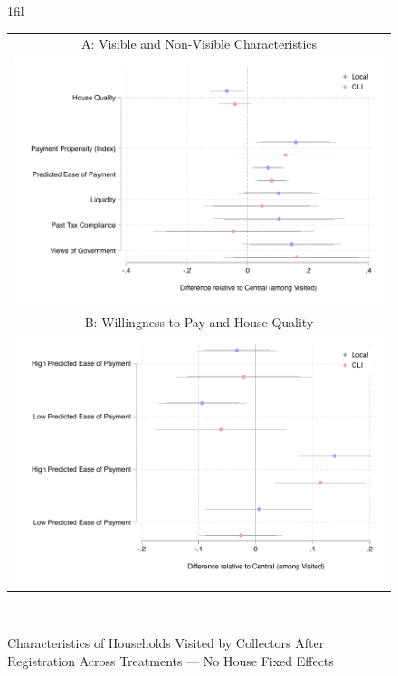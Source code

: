 \documentclass[12pt,english]{article}
\makeatletter
\newcommand*{\centerfloat}{%
  \parindent \z@
  \leftskip \z@ \@plus 1fil \@minus \textwidth
  \rightskip\leftskip
  \parfillskip \z@skip}
\makeatother
\begin{document}
\begin{figure}[H]
\centering{}\caption{Characteristics of Households Visited by Collectors After Registration Across Treatments --- No House Fixed Effects
\label{fig:main_targeting1_NoHouseFE}}
\centering
\centerfloat
\begin{tabular}{c}
A: Visible and Non-Visible Characteristics\\
\includegraphics[scale=.7]{Output/chars_visited_nohouseFE.pdf}\\
B: Willingness to Pay and House Quality\\
\includegraphics[scale=.7]{Output/chars_PEXHQ_nohouseFE.pdf}\\
\end{tabular}
\usebox{\tablebox}\\[1ex]

\end{figure}
\end{document}

